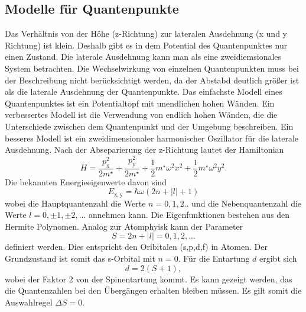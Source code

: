 \subsection{Modelle für Quantenpunkte}
Das Verhältnis von der Höhe (z-Richtung) zur lateralen Ausdehnung  (x und y Richtung) ist klein. Deshalb gibt es in dem Potential des Quantenpunktes nur einen Zustand. Die laterale Ausdehnung kann man als eine zweidiemsionales System betrachten. Die Wechselwirkung von einzelnen Quantenpunkten muss bei der Beschreibung nicht berücksichtigt werden, da der Abstabd deutlich größer ist als die laterale Ausdehnung der Quantenpunkte. 
Das einfachste Modell eines Quantenpunktes ist ein Potentialtopf mit unendlichen hohen Wänden. Ein verbessertes Modell ist die Verwendung von endlich hohen Wänden, die die Unterschiede zwischen dem Quantenpunkt und der Umgebung beschreiben. Ein besseres Modell ist ein zweidimensionaler harmonischer Oszillator für die laterale Ausdehnung. Nach der Abseparierung der z-Richtung lautet der Hamiltonian
\begin{equation}  
H = \frac{p_\mathrm{x}^2}{2 m^\star} + \frac{p_\mathrm{y}^2}{2 m^\star} + \frac{1}{2} m^\star \omega^2 x^2 + \frac{1}{2} m^\star \omega^2 y^2. 
\end{equation} 
Die bekannten Energieeigenwerte davon sind 
\begin{equation}
E_{\mathrm{x,y}} = \hbar \omega (2n +|l| +1)
\end{equation}
wobei die Hauptquantenzahl die Werte $n = 0,1,2 ..$ und die Nebenquantenzahl die Werte $l = 0, \pm1, \pm2, ...$ annehmen kann. 
Die Eigenfunktionen bestehen aus den Hermite Polynomen. Analog zur Atomphyisk kann der Parameter 
\begin{equation}
S = 2n +|l| = 0,1,2, ...
\end{equation}
definiert werden. Dies entspricht den Oribitalen (s,p,d,f) in Atomen. 
Der Grundzustand ist somit das s-Orbital mit $n = 0$. 
Für die Entartung $d$ ergibt sich 
\begin{equation}
d = 2(S+1),
\end{equation}
wobei der Faktor 2 von der Spinentartung kommt. Es kann gezeigt werden, das die Quantenzahlen bei den Übergängen erhalten bleiben müssen.  Es gilt somit die Auswahlregel $\Delta S =0$. 

